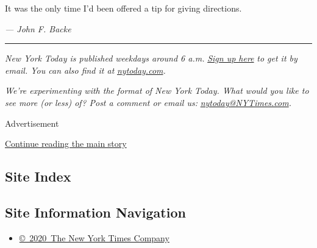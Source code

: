 It was the only time I'd been offered a tip for giving directions.

\emph{--- John F. Backe}

\begin{center}\rule{0.5\linewidth}{\linethickness}\end{center}

\emph{New York Today is published weekdays around 6 a.m.}
\href{https://www.nytimes3xbfgragh.onion/newsletters/newyorktoday?module=inline}{\emph{Sign
up here}} \emph{to get it by email. You can also find it at}
\href{http://www.nytoday.com/}{\emph{nytoday.com}}\emph{.}

\emph{We're experimenting with the format of New York Today. What would
you like to see more (or less) of? Post a comment or email us:}
\href{mailto:nytoday@NYTimes.com}{\emph{nytoday@NYTimes.com}}\emph{.}

Advertisement

\protect\hyperlink{after-bottom}{Continue reading the main story}

\hypertarget{site-index}{%
\subsection{Site Index}\label{site-index}}

\hypertarget{site-information-navigation}{%
\subsection{Site Information
Navigation}\label{site-information-navigation}}

\begin{itemize}
\tightlist
\item
  \href{https://help.nytimes3xbfgragh.onion/hc/en-us/articles/115014792127-Copyright-notice}{©~2020~The
  New York Times Company}
\end{itemize}

